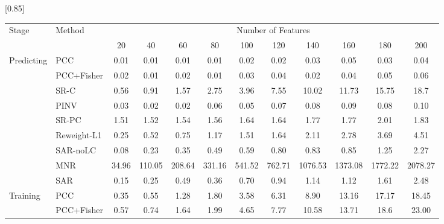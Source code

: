 \begin{table}[htbp]
  \centering
  \vspace{0.2cm}
  \zhongwu
  \scalebox{0.85}[0.85]{
  \begin{tabular}{llcccccccccc}
  \toprule
  \multirow{2}{*}{Stage} & \multirow{2}{*}{Method} & \multicolumn{10}{c}{Number of Features} \\
  \cline{3-12}
   & & 20 & 40 & 60 & 80 & 100 & 120 & 140 & 160 & 180 & 200\\
  \midrule
  \multirow{7}{*}{Predicting} & PCC & 0.01 & 0.01 & 0.01 & 0.01 & 0.02 & 0.02 & 0.03 & 0.05 & 0.03 & 0.04 \\
  & PCC+Fisher & 0.02 & 0.01 & 0.02 & 0.01 & 0.03 & 0.04 & 0.02 & 0.04 & 0.05 & 0.06 \\
  & SR-C & 0.56 & 0.91 & 1.57 & 2.75 & 3.96 & 7.55 & 10.02 & 11.73 & 15.75 & 18.7\\
  & PINV & 0.03 & 0.02 & 0.02 & 0.06 & 0.05 & 0.07 & 0.08 & 0.09 & 0.08 & 0.10 \\
  & SR-PC & 1.51 & 1.52 & 1.54 & 1.56 & 1.64 & 1.64 & 1.77 & 1.77 & 2.01 & 1.83 \\
  & Reweight-L1 & 0.25 & 0.52 & 0.75 & 1.17 & 1.51 & 1.64 & 2.11 & 2.78 & 3.69 & 4.51 \\
  & SAR-noLC & 0.08 & 0.23 & 0.35 & 0.49 & 0.59 & 0.80 & 0.83 & 0.85 & 1.25 & 2.27 \\
  & \cellcolor[rgb]{.7,.8,.9}MNR & \cellcolor[rgb]{.7,.8,.9}34.96 & \cellcolor[rgb]{.7,.8,.9}110.05 & \cellcolor[rgb]{.7,.8,.9}208.64 & \cellcolor[rgb]{.7,.8,.9}331.16 & \cellcolor[rgb]{.7,.8,.9}541.52 & \cellcolor[rgb]{.7,.8,.9}762.71 & \cellcolor[rgb]{.7,.8,.9}1076.53 & \cellcolor[rgb]{.7,.8,.9}1373.08 & \cellcolor[rgb]{.7,.8,.9}1772.22 & \cellcolor[rgb]{.7,.8,.9}2078.27 \\
  & \cellcolor[rgb]{1,.9,.6}SAR & \cellcolor[rgb]{1,.9,.6}0.15 & \cellcolor[rgb]{1,.9,.6}0.25 & \cellcolor[rgb]{1,.9,.6}0.49 & \cellcolor[rgb]{1,.9,.6}0.36 & \cellcolor[rgb]{1,.9,.6}0.70 & \cellcolor[rgb]{1,.9,.6}0.94 & \cellcolor[rgb]{1,.9,.6}1.14 & \cellcolor[rgb]{1,.9,.6}1.12 & \cellcolor[rgb]{1,.9,.6}1.61 & \cellcolor[rgb]{1,.9,.6}2.48 \\
  \midrule
  \multirow{7}{*}{Training} & PCC & 0.35 & 0.55 & 1.28 & 1.80 & 3.58 & 6.31 & 8.90 & 13.16 & 17.17 & 18.45 \\
  & PCC+Fisher & 0.57 & 0.74 & 1.64 & 1.99 & 4.65 & 7.77 & 10.58 & 13.71 & 18.6 & 23.00 \\

\end{tabular}}
\end{table}
